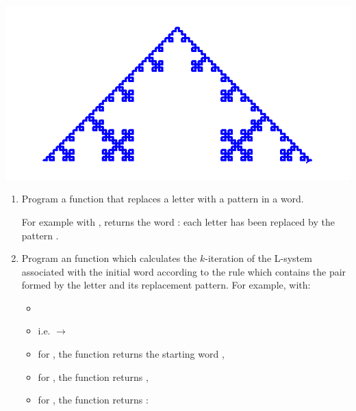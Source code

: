 \documentclass[11pt,class=report,crop=false]{standalone}
\begin{document}
\begin{activite}



\begin{center}
\includegraphics[scale=\myscale,scale=0.4]{screen-lsystems-2}
\end{center}

\begin{enumerate}
  \item Program a  function that replaces a letter with a pattern in a word. 

For example with ,  returns the word : each letter  has been replaced by the pattern .
 
  \item Program an  function
  which calculates the $k$-iteration of the L-system associated with the initial word  according to the rule  which contains the pair formed by the letter and its replacement pattern.
  For example, with:
  \begin{itemize}
    \item {}
    \item {} i.e.  $\rightarrow$ 
    \item for , the function returns the starting word ,
    \item for , the function returns ,
    \item for , the function returns :  
     

\end{itemize}
\end{enumerate}
\end{activite}
\end{document}
